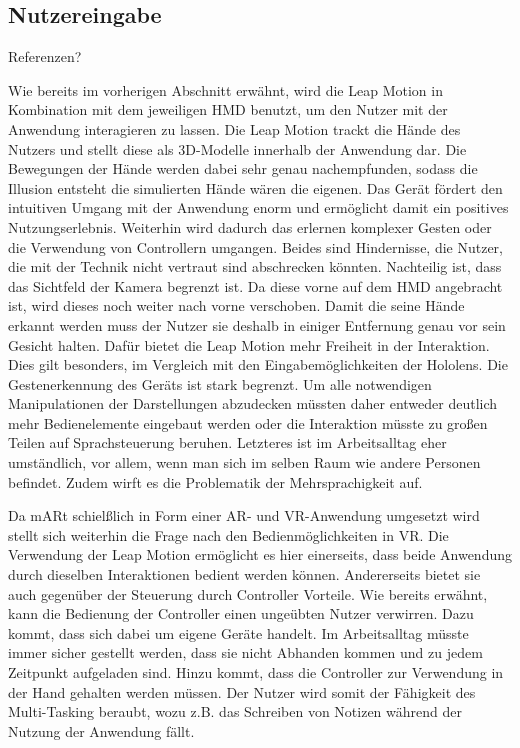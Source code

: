\subsection{Nutzereingabe}
Referenzen?

Wie bereits im vorherigen Abschnitt erwähnt, wird die Leap Motion in Kombination mit dem jeweiligen HMD benutzt, um den Nutzer mit der Anwendung interagieren zu lassen. 
Die Leap Motion trackt die Hände des Nutzers und stellt diese als 3D-Modelle innerhalb der Anwendung dar. Die Bewegungen der Hände werden dabei sehr genau nachempfunden, sodass die Illusion entsteht die simulierten Hände wären die eigenen. 
Das Gerät fördert den intuitiven Umgang mit der Anwendung enorm und ermöglicht damit ein positives Nutzungserlebnis. Weiterhin wird dadurch das erlernen komplexer Gesten oder die Verwendung von Controllern umgangen. Beides sind Hindernisse, die Nutzer, die mit der Technik nicht vertraut sind abschrecken könnten. 
Nachteilig ist, dass das Sichtfeld der Kamera begrenzt ist. Da diese vorne auf dem HMD angebracht ist, wird dieses noch weiter nach vorne verschoben. Damit die seine Hände erkannt werden muss der Nutzer sie deshalb in einiger Entfernung genau vor sein Gesicht halten. 
Dafür bietet die Leap Motion mehr Freiheit in der Interaktion. Dies gilt besonders, im Vergleich mit den Eingabemöglichkeiten der Hololens. 
Die Gestenerkennung des Geräts ist stark begrenzt. Um alle notwendigen Manipulationen der Darstellungen abzudecken müssten daher entweder deutlich mehr Bedienelemente eingebaut werden oder die Interaktion müsste zu großen Teilen auf Sprachsteuerung beruhen. 
Letzteres ist im Arbeitsalltag eher umständlich, vor allem, wenn man sich im selben Raum wie andere Personen befindet. Zudem wirft es die Problematik der Mehrsprachigkeit auf. 

Da mARt schielßlich in Form einer AR- und VR-Anwendung umgesetzt wird stellt sich weiterhin die Frage nach den Bedienmöglichkeiten in VR. Die Verwendung der Leap Motion ermöglicht es hier einerseits, dass beide Anwendung durch dieselben Interaktionen bedient werden können. Andererseits bietet sie auch gegenüber der Steuerung durch Controller Vorteile. 
Wie bereits erwähnt, kann die Bedienung der Controller einen ungeübten Nutzer verwirren. Dazu kommt, dass sich dabei um eigene Geräte handelt. Im Arbeitsalltag müsste immer sicher gestellt werden, dass sie nicht Abhanden kommen und zu jedem Zeitpunkt aufgeladen sind. 
Hinzu kommt, dass die Controller zur Verwendung in der Hand gehalten werden müssen. Der Nutzer wird somit der Fähigkeit des Multi-Tasking beraubt, wozu z.B. das Schreiben von Notizen während der Nutzung der Anwendung fällt. 

